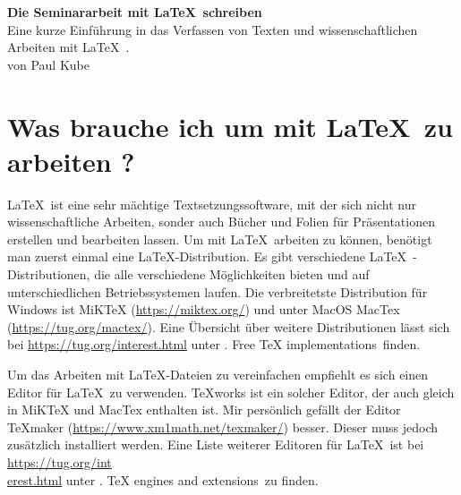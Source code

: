 \documentclass[a4paper, 12pt]{scrreprt}
\begin{document}
\begin{titlepage}

\begin{center}
\vspace*{2cm}
{\bfseries\LARGE Die Seminararbeit mit \LaTeX\, schreiben\\} 
\vspace{3cm}
Eine kurze Einführung in das Verfassen von Texten und wissenschaftlichen Arbeiten mit \LaTeX\, .\\
\vspace{4cm}
von Paul Kube
\end{center}

\end{titlepage}

\tableofcontents
\thispagestyle{empty}
\newpage
\setcounter{page}{1}

\chapter{Was brauche ich um mit \LaTeX\, zu arbeiten ?}
\LaTeX\, ist eine sehr mächtige Textsetzungssoftware, mit der sich nicht nur wissenschaftliche Arbeiten, sonder auch Bücher und Folien für Präsentationen erstellen und bearbeiten lassen. Um mit \LaTeX\, arbeiten zu können, benötigt man zuerst einmal eine \LaTeX -Distribution. Es gibt verschiedene \LaTeX\, -Distributionen, die alle verschiedene Möglichkeiten bieten und auf unterschiedlichen Betriebssystemen laufen. Die verbreitetste Distribution für Windows ist MiKTeX (\href{https://miktex.org/}{https://miktex.org/}) und unter MacOS MacTex (\href{https://tug.org/mactex/}{https://tug.org/mactex/}). Eine Übersicht über weitere Distributionen lässt sich bei \href{https://tug.org/interest.html}{https://tug.org/interest.html} unter . Free TeX implementations\grqq\, finden.

Um das Arbeiten mit \LaTeX -Dateien zu vereinfachen empfiehlt es sich einen Editor für \LaTeX\, zu verwenden. TeXworks ist ein solcher Editor, der auch gleich in MiKTeX und MacTex enthalten ist. Mir persönlich gefällt der Editor TeXmaker (\href{https://www.xm1math.net/texmaker/}{https://www.xm1math.net/texmaker/}) besser. Dieser muss jedoch zusätzlich installiert werden. Eine Liste weiterer Editoren für \LaTeX\, ist bei \href{https://tug.org/interest.html}{https://tug.org/int\\erest.html} unter . TeX engines and extensions\grqq\, zu finden.
 
\end{document}
